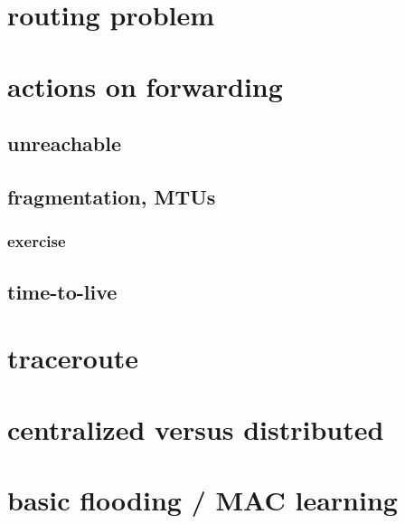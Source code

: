 
\section{routing problem}



\section{actions on forwarding}



\subsection{unreachable}

\subsection{fragmentation, MTUs}


\subsubsection{exercise}


\subsection{time-to-live}



\section{traceroute}


\section{centralized versus distributed}


\section{basic flooding / MAC learning}


